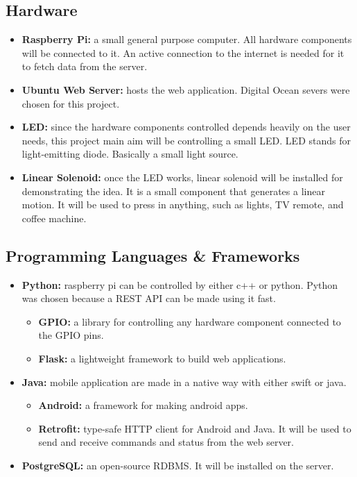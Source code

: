 \documentclass[12pt, oneside, a4paper]{book}
\newcommand\boldcolor[1]{\textcolor{bold}{\textbf{#1}}}
\begin{document}
			\subsection{Hardware}
				\begin{itemize}
				\item \boldcolor{Raspberry Pi:} a small general purpose computer. All hardware components will be connected to it. An active connection to the internet is needed for it to fetch data from the server\cite{raspberry}. %
				\item \boldcolor{Ubuntu Web Server:} hosts the web application. Digital Ocean severs\cite{digital_ocean} were chosen for this project.
				
				\item \boldcolor{LED:} since the hardware components controlled depends heavily on the user needs, this project main aim will be controlling a small LED. LED stands for light-emitting diode\cite{led}. Basically a small light source. %
				\item \boldcolor{Linear Solenoid:} once the LED works, linear solenoid will be installed for demonstrating the idea\cite{linear}. It is a small component that generates a linear motion. It will be used to press in anything, such as lights, TV remote, and coffee machine. %
				\end{itemize}
				
			\subsection{Programming Languages \& Frameworks}
				\begin{itemize}
					
					\item \boldcolor{Python:} raspberry pi can be controlled by either c++ or python. Python was chosen because a REST API can be made using it fast.
		 				\begin{itemize}
		 					\item \textbf{GPIO:} a library for controlling any hardware component connected to the GPIO pins\cite{gpio}.
		 					\item \textbf{Flask:} a lightweight framework to build web applications.
						\end{itemize}
					\item \boldcolor{Java:} mobile application are made in a native way with either swift or java.
						\begin{itemize}
							\item \textbf{Android:} a framework for making android apps.
							\item \textbf{Retrofit:} type-safe HTTP client for Android and Java\cite{retro}. It will be used to send and receive commands and status from the web server.
							
						\end{itemize}
					\item \boldcolor{PostgreSQL:} an open-source RDBMS\cite{postgres}. It will be installed on the server.
				\end{itemize}
			
\end{document}
